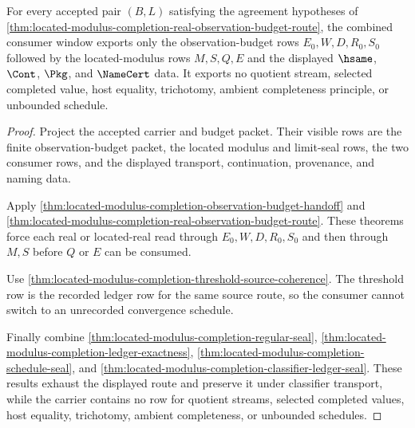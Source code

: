 \begin{theorem}
\label{thm:located-modulus-completion-consumer-window-nonescape}
For every accepted pair $(B,L)$ satisfying the agreement hypotheses of \autoref{thm:located-modulus-completion-real-observation-budget-route}, the combined consumer window exports only the observation-budget rows $E_0,W,D,R_0,S_0$ followed by the located-modulus rows $M,S,Q,E$ and the displayed $\hsame$, $\Cont$, $\Pkg$, and $\NameCert$ data. It exports no quotient stream, selected completed value, host equality, trichotomy, ambient completeness principle, or unbounded schedule.
\end{theorem}
\begin{proof}
Project the accepted carrier and budget packet. Their visible rows are the finite observation-budget packet, the located modulus and limit-seal rows, the two consumer rows, and the displayed transport, continuation, provenance, and naming data.

Apply \autoref{thm:located-modulus-completion-observation-budget-handoff} and \autoref{thm:located-modulus-completion-real-observation-budget-route}. These theorems force each real or located-real read through $E_0,W,D,R_0,S_0$ and then through $M,S$ before $Q$ or $E$ can be consumed.

Use \autoref{thm:located-modulus-completion-threshold-source-coherence}. The threshold row is the recorded ledger row for the same source route, so the consumer cannot switch to an unrecorded convergence schedule.

Finally combine \autoref{thm:located-modulus-completion-regular-seal}, \autoref{thm:located-modulus-completion-ledger-exactness}, \autoref{thm:located-modulus-completion-schedule-seal}, and \autoref{thm:located-modulus-completion-classifier-ledger-seal}. These results exhaust the displayed route and preserve it under classifier transport, while the carrier contains no row for quotient streams, selected completed values, host equality, trichotomy, ambient completeness, or unbounded schedules.
\end{proof}

